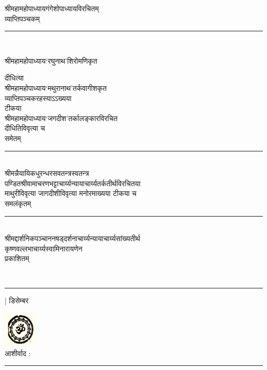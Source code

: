 \documentclass[10pt, openany]{book}
\begin{document}
\vspace*{\fill}
\newpage
\begin{center}
{\Large श्रीमहामहोपाध्यायगंगेशोपाध्यायविरचितम्}\textendash\\
\vspace{3mm}
{\Huge व्याप्तिपञ्चकम्} \\
\vspace{3mm}
\rule{.15\linewidth}{.5pt}\\
\vspace{5mm}

श्रीमहामहोपाध्याय`रघुनाथ'शिरोमणिकृत \textemdash \\
{\small \textemdash दीधित्या\textemdash\\
श्रीमहामहोपाध्याय`मथुरानाथ'तर्कवागीशकृत\textemdash \\
व्याप्तिपञ्चकरहस्याऽऽख्यया\\
{\small टीकया\textemdash} \\
श्रीमहामहोपाध्याय`जगदीश'तर्कालङ्कारविरचित\textemdash \\
दीधितिविवृत्या च\\
{\large समेतम्} \\
\rule{.1\linewidth}{.5pt}\\
\vspace{2mm}
श्रीमन्नैयायिकधुरन्धरसवतन्त्रस्वतन्त्र\textendash\\
पण्डितश्रीवामाचरणभट्टाचार्य्यन्यायाचार्य्यतर्कतीर्थविरचितया\\
माथुरीविवृत्या जागदीशीविवृत्या मनोरमाख्यया टीकया च\\
{\small समलंकृतम्}\\
\rule{.1\linewidth}{.5pt}\\
\vspace{2mm}
श्रीमद्दार्शनिकपञ्चानन\textendash षड्दर्शनाचार्य्य\textendash न्यायाचार्य्य\textendash सांख्यतीर्थ\textendash \\
{\large कृष्णवल्लभाचार्य्यस्वामिनारायणेन} \\
प्रकाशितम्}\\
\rule{.1\linewidth} {.5pt}
\end{center}


\hfill | डिसेम्बर 
\newpage
\begin{center}
\includegraphics{graphics/Capture4.PNG}  \\
\la
 आशीर्वाद :\\
 \rule{.1\linewidth}{2pt}
 \end{center}
 
\end{document}
